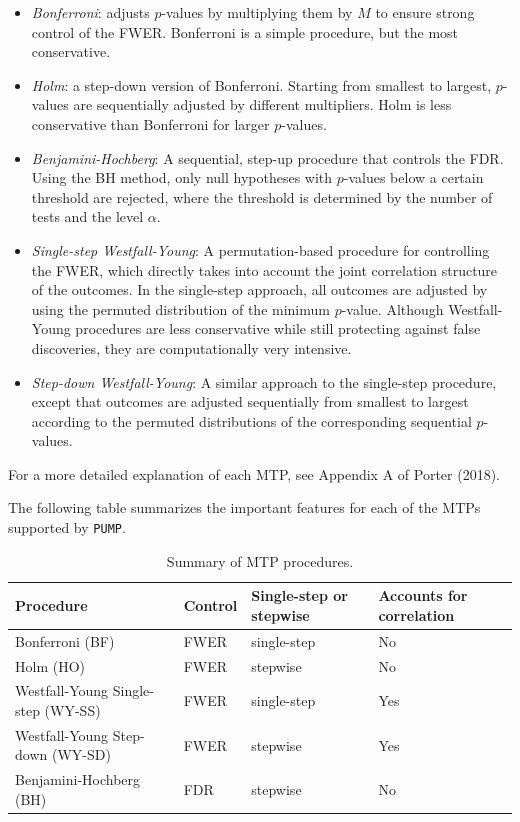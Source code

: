 \documentclass[
]{article}
\providecommand{\tightlist}{%
  \setlength{\itemsep}{0pt}\setlength{\parskip}{0pt}}
\begin{document}
\begin{itemize}
\tightlist
\item
  \emph{Bonferroni}: adjusts \(p\)-values by multiplying them by \(M\)
  to ensure strong control of the FWER. Bonferroni is a simple
  procedure, but the most conservative.
\item
  \emph{Holm}: a step-down version of Bonferroni. Starting from smallest
  to largest, \(p\)-values are sequentially adjusted by different
  multipliers. Holm is less conservative than Bonferroni for larger
  \(p\)-values.
\item
  \emph{Benjamini-Hochberg}: A sequential, step-up procedure that
  controls the FDR. Using the BH method, only null hypotheses with
  \(p\)-values below a certain threshold are rejected, where the
  threshold is determined by the number of tests and the level
  \(\alpha\).
\item
  \emph{Single-step Westfall-Young}: A permutation-based procedure for
  controlling the FWER, which directly takes into account the joint
  correlation structure of the outcomes. In the single-step approach,
  all outcomes are adjusted by using the permuted distribution of the
  minimum \(p\)-value. Although Westfall-Young procedures are less
  conservative while still protecting against false discoveries, they
  are computationally very intensive.
\item
  \emph{Step-down Westfall-Young}: A similar approach to the single-step
  procedure, except that outcomes are adjusted sequentially from
  smallest to largest according to the permuted distributions of the
  corresponding sequential \(p\)-values.
\end{itemize}

For a more detailed explanation of each MTP, see Appendix A of Porter
(2018).

The following table summarizes the important features for each of the
MTPs supported by \texttt{PUMP}.

\begin{table}[h!]
\centering
\begin{tabular}{l l l l}
Procedure                             & Control & Single-step or stepwise & Accounts for correlation \\ \hline
Bonferroni (BF)                       & FWER    & single-step             & No                       \\
Holm (HO)                             & FWER    & stepwise                & No\\
Westfall-Young Single-step (WY-SS)    & FWER    & single-step             & Yes\\
Westfall-Young Step-down (WY-SD)      & FWER    & stepwise                & Yes\\
Benjamini-Hochberg (BH)               & FDR     & stepwise                & No
\end{tabular}
\caption{Summary of MTP procedures.}
  \label{tab:mtp}
\end{table}
\end{document}
